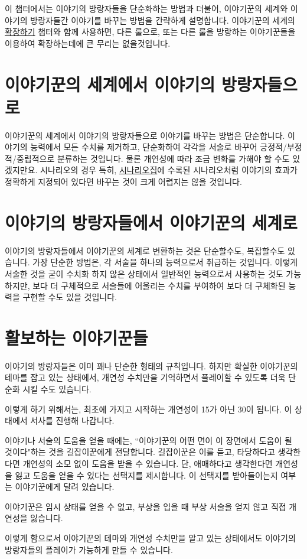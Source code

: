 \documentclass{report}
\begin{document}
	이 챕터에서는 이야기의 방랑자들을 단순화하는 방법과 더불어, 이야기꾼의 세계와 이야기의 방랑자들간 이야기를 바꾸는 방법을 간략하게 설명합니다. 이야기꾼의 세계의 \hyperlink{expand}{확장하기} 챕터와 함께 사용하면, 다른 룰으로, 또는 다른 룰을 방랑하는 이야기꾼들을 이용하여 확장하는데에 큰 무리는 없을것입니다.
	
	\section*{이야기꾼의 세계에서 이야기의 방랑자들으로}
	이야기꾼의 세계에서 이야기의 방랑자들으로 이야기를 바꾸는 방법은 단순합니다. 이야기의 능력에서 모든 수치를 제거하고, 단순화하여 각각을 서술로 바꾸어 긍정적/부정적/중립적으로 분류하는 것입니다. 물론 개연성에 따라 조금 변화를 가해야 할 수도 있겠지만요. 시나리오의 경우 특히, \href{https://github.com/n0n3x1573n7/WoS-Scenarios}{시나리오집}에 수록된 시나리오처럼 이야기의 효과가 정확하게 지정되어 있다면 바꾸는 것이 크게 어렵지는 않을 것입니다.
	
	\section*{이야기의 방랑자들에서 이야기꾼의 세계로}
	이야기의 방랑자들에서 이야기꾼의 세계로 변환하는 것은 단순할수도, 복잡할수도 있습니다. 가장 단순한 방법은, 각 서술을 하나의 능력으로서 취급하는 것입니다. 이렇게 서술한 것을 굳이 수치화 하지 않은 상태에서 일반적인 능력으로서 사용하는 것도 가능하지만, 보다 더 구체적으로 서술들에 어울리는 수치를 부여하여 보다 더 구체화된 능력을 구현할 수도 있을 것입니다.
	
	\hypertarget{walking-storytellers}{}
	\section*{활보하는 이야기꾼들}
	이야기의 방랑자들은 이미 꽤나 단순한 형태의 규칙입니다. 하지만 확실한 이야기꾼의 테마를 잡고 있는 상태에서, 개연성 수치만을 기억하면서 플레이할 수 있도록 더욱 단순화 시킬 수도 있습니다.
	
	이렇게 하기 위해서는, 최초에 가지고 시작하는 개연성이 15가 아닌 30이 됩니다. 이 상태에서 서사를 진행해 나갑니다.
	
	이야기나 서술의 도움을 얻을 때에는, ``이야기꾼의 어떤 면이 이 장면에서 도움이 될 것이다"하는 것을 길잡이꾼에게 전달합니다. 길잡이꾼은 이를 듣고, 타당하다고 생각한다면 개연성의 소모 없이 도움을 받을 수 있습니다. 단, 애매하다고 생각한다면 개연성을 잃고 도움을 얻을 수 있다는 선택지를 제시합니다. 이 선택지를 받아들이는지 여부는 이야기꾼에게 달려 있습니다.
	
	이야기꾼은 임시 상태를 얻을 수 없고, 부상을 입을 때 부상 서술을 얻지 않고 직접 개연성을 잃습니다.
	
	이렇게 함으로서 이야기꾼의 테마와 개연성 수치만을 알고 있는 상태에서도 이야기의 방랑자들의 플레이가 가능하게 만들 수 있습니다.
\end{document}
